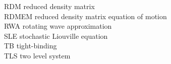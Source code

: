 \documentclass[12pt,twoside,a4paper]{report}
\begin{document}
\begin{tabbing}
RDM                   \> reduced density matrix\\
RDMEM                 \> reduced density matrix equation of motion\\
RWA                   \> rotating wave approximation\\
SLE                   \> stochastic Liouville equation\\
TB                    \> tight-binding\\
TLS                   \> two level system\\


\end{tabbing}
\end{document}
